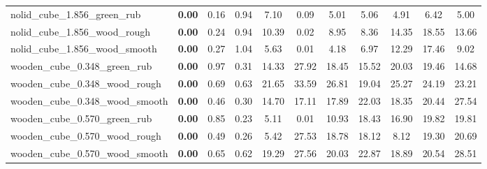 \begin{table}[H]
{\begin{tabular}{l cccccccccc}
        nolid\_cube\_1.856\_green\_rub & \textbf{0.00} & 0.16 & 0.94 & 7.10 & 0.09 & 5.01 & 5.06 & 4.91 & 6.42 & 5.00 \\
        nolid\_cube\_1.856\_wood\_rough & \textbf{0.00} & 0.24 & 0.94 & 10.39 & 0.02 & 8.95 & 8.36 & 14.35 & 18.55 & 13.66 \\
        nolid\_cube\_1.856\_wood\_smooth & \textbf{0.00} & 0.27 & 1.04 & 5.63 & 0.01 & 4.18 & 6.97 & 12.29 & 17.46 & 9.02 \\
        wooden\_cube\_0.348\_green\_rub & \textbf{0.00} & 0.97 & 0.31 & 14.33 & 27.92 & 18.45 & 15.52 & 20.03 & 19.46 & 14.68 \\
        wooden\_cube\_0.348\_wood\_rough & \textbf{0.00} & 0.69 & 0.63 & 21.65 & 33.59 & 26.81 & 19.04 & 25.27 & 24.19 & 23.21 \\
        wooden\_cube\_0.348\_wood\_smooth & \textbf{0.00} & 0.46 & 0.30 & 14.70 & 17.11 & 17.89 & 22.03 & 18.35 & 20.44 & 27.54 \\
        wooden\_cube\_0.570\_green\_rub & \textbf{0.00} & 0.85 & 0.23 & 5.11 & 0.01 & 10.93 & 18.43 & 16.90 & 19.82 & 19.81 \\
        wooden\_cube\_0.570\_wood\_rough & \textbf{0.00} & 0.49 & 0.26 & 5.42 & 27.53 & 18.78 & 18.12 & 8.12 & 19.30 & 20.69 \\
        wooden\_cube\_0.570\_wood\_smooth & \textbf{0.00} & 0.65 & 0.62 & 19.29 & 27.56 & 20.03 & 22.87 & 18.89 & 20.54 & 28.51 \\
        \bottomrule
    \end{tabular}
    }
\end{table}



\vspace{1cm}

\clearpage

